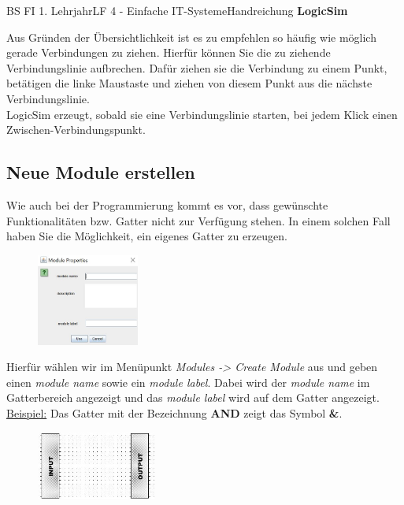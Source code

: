 \documentclass[11pt,oneside,openany,headings=optiontotoc,11pt,numbers=noenddot]{article}
\begin{document}
\begin{worksheet}{BS FI 1. Lehrjahr}{LF 4 - Einfache IT-Systeme}{Handreichung \textbf{LogicSim}}
\begin{figure}
		\end{figure}
		Aus Gründen der Übersichtlichkeit ist es zu empfehlen so häufig wie möglich gerade Verbindungen zu ziehen. Hierfür können Sie die zu ziehende Verbindungslinie aufbrechen. Dafür ziehen sie die Verbindung zu einem Punkt, betätigen die linke Maustaste und ziehen von diesem Punkt aus die nächste Verbindungslinie.\\
		LogicSim erzeugt, sobald sie eine Verbindungslinie starten, bei jedem Klick einen Zwischen-Verbindungspunkt.\\
		\subsection{Neue Module erstellen}
		Wie auch bei der Programmierung kommt es vor, dass gewünschte Funktionalitäten bzw. Gatter nicht zur Verfügung stehen. In einem solchen Fall haben Sie die Möglichkeit, ein eigenes Gatter zu erzeugen.\\
		\par\noindent
		\begin{figure}
			\vspace{-20pt}
			\includegraphics[width=0.3\textwidth,align=t]{../99_Bilder/new_mod.jpg}
		\end{figure}
		Hierfür wählen wir im Menüpunkt \textit{Modules -> Create Module} aus und geben einen \textit{module name} sowie ein \textit{module label}. Dabei wird der \textit{module name} im Gatterbereich angezeigt und das \textit{module label} wird auf dem Gatter angezeigt.\\
		\underline{Beispiel:} Das Gatter mit der Bezeichnung \textbf{AND} zeigt das Symbol \textbf{\&}.\\
		\par\bigskip\noindent
		\begin{figure}
			\vspace{-10pt}
			\hspace{-25pt}
			\includegraphics[width=0.35\textwidth]{../99_Bilder/inout.jpg}

\end{figure}
\end{worksheet}
\end{document}
